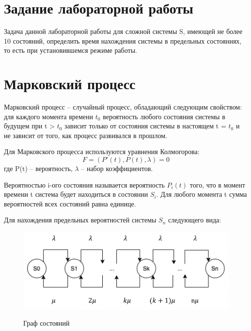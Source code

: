 \documentclass[12pt,a4paper,oneside]{report}
\begin{document}
\chapter{Задание лабораторной работы}
\quad Задача данной лабораторной работы для сложной системы S, имеющей не более 10 состояний, определить время нахождения системы в предельных состояниях, то есть при установившемся режиме работы.  

\chapter{Марковский процесс}
\quad Марковский процесс – случайный процесс, обладающий следующим свойством: для каждого момента времени  $t_{0}$ вероятность любого состояния  системы в будущем при t > $t_{0}$ зависит только от состояния системы в настоящем t = $t_{0}$ и не зависит от того, как процесс развивался в прошлом. 

Для Марковского процесса используются уравнения Колмогорова:
\begin{equation}
    F = (P'(t), P(t), \lambda)=0
\end{equation}
  где P(t) – вероятность, $\lambda$ – набор коэффициентов.
  
Вероятностью i-ого состояния называется вероятность $P_{i}(t)$ того, что в момент времени t система будет находиться в состоянии $S_{i}$. Для любого момента t сумма вероятностей всех состояний равна единице.

Для нахождения предельных вероятностей системы $S_{n}$ следующего вида:
\begin{figure}[H]
	\centering
	\includegraphics[scale=0.4]{1.png}
	\label{fig:screenshot001}
	\caption{Граф состояний}
\end{figure}
\end{document}
